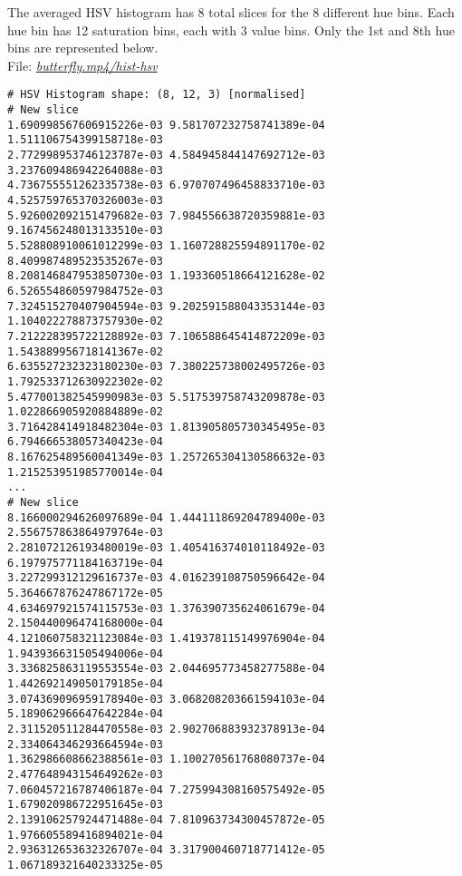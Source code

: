 The averaged HSV histogram has 8 total slices for the 8 different hue bins. Each hue bin has 12 saturation bins, each with 3 value bins. Only the 1st and 8th hue bins are represented below.\\

File: \underline{\textit{butterfly.mp4/hist-hsv}}

\begin{lstlisting}
# HSV Histogram shape: (8, 12, 3) [normalised]
# New slice
1.690998567606915226e-03 9.581707232758741389e-04 1.511106754399158718e-03
2.772998953746123787e-03 4.584945844147692712e-03 3.237609486942264088e-03
4.736755551262335738e-03 6.970707496458833710e-03 4.525759765370326003e-03
5.926002092151479682e-03 7.984556638720359881e-03 9.167456248013133510e-03
5.528808910061012299e-03 1.160728825594891170e-02 8.409987489523535267e-03
8.208146847953850730e-03 1.193360518664121628e-02 6.526554860597984752e-03
7.324515270407904594e-03 9.202591588043353144e-03 1.104022278873757930e-02
7.212228395722128892e-03 7.106588645414872209e-03 1.543889956718141367e-02
6.635527232323180230e-03 7.380225738002495726e-03 1.792533712630922302e-02
5.477001382545990983e-03 5.517539758743209878e-03 1.022866905920884889e-02
3.716428414918482304e-03 1.813905805730345495e-03 6.794666538057340423e-04
8.167625489560041349e-03 1.257265304130586632e-03 1.215253951985770014e-04
...
# New slice
8.166000294626097689e-04 1.444111869204789400e-03 2.556757863864979764e-03
2.281072126193480019e-03 1.405416374010118492e-03 6.197975771184163719e-04
3.227299312129616737e-03 4.016239108750596642e-04 5.364667876247867172e-05
4.634697921574115753e-03 1.376390735624061679e-04 2.150440096474168000e-04
4.121060758321123084e-03 1.419378115149976904e-04 1.943936631505494006e-04
3.336825863119553554e-03 2.044695773458277588e-04 1.442692149050179185e-04
3.074369096959178940e-03 3.068208203661594103e-04 5.189062966647642284e-04
2.311520511284470558e-03 2.902706883932378913e-04 2.334064346293664594e-03
1.362986608662388561e-03 1.100270561768080737e-04 2.477648943154649262e-03
7.060457216787406187e-04 7.275994308160575492e-05 1.679020986722951645e-03
2.139106257924471488e-04 7.810963734300457872e-05 1.976605589416894021e-04
2.936312653632326707e-04 3.317900460718771412e-05 1.067189321640233325e-05
\end{lstlisting}
